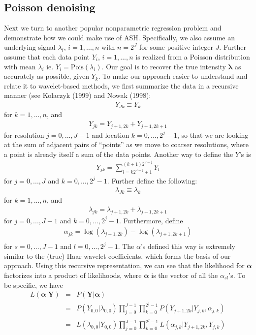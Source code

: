 \documentclass[12pt]{article}
\newcommand{\Ga}{\alpha}
\newcommand{\Gl}{\lambda}    \newcommand{\GL}{\Lambda}
\begin{document}
\subsection{Poisson denoising}
Next we turn to another popular nonparametric regression problem and demonstrate how we could make use of ASH. Specifically, we also assume an underlying signal $\Gl_i$, $i=1,...,n$ with $n=2^J$ for some positive integer $J$. Further assume that each data point $Y_i$, $i=1,...,n$ is realized from a Poisson distribution with mean $\Gl_i$ ie. $Y_i=\textrm{Pois}(\Gl_i)$. Our goal is to recover the true intensity $\bm{\Gl}$ as accurately as possible, given $Y_k$. To make our approach easier to understand and relate it to wavelet-based methods, we first summarize the data in a recursive manner (see Kolaczyk (1999) and Nowak (1998):
\begin{eqnarray}Y_{Jk}\equiv Y_k\end{eqnarray}
for $k=1,...,n$, and
\begin{eqnarray}Y_{jk}=Y_{j+1,2k}+Y_{j+1,2k+1}\end{eqnarray}
for resolution $j=0,...,J-1$ and location $k=0,...,2^j-1$, so that we are looking at the sum of adjacent pairs of ``points'' as we move to coarser resolutions, where a point is already itself a sum of the data points. Another way to define the $Y$'s is
\begin{eqnarray}Y_{jk}=\sum_{l=k2^{J-j}+1}^{(k+1)2^{J-j}}Y_l\end{eqnarray}
for $j=0,...,J$ and $k=0,...,2^j-1$.
Further define the following:
\begin{eqnarray}\Gl_{Jk}\equiv \Gl_k\end{eqnarray}
for $k=1,...,n$, and
\begin{eqnarray}\Gl_{jk}=\Gl_{j+1,2k}+\Gl_{j+1,2k+1}\end{eqnarray}
for $j=0,...,J-1$ and $k=0,...,2^j-1$. Furthermore, define
\begin{eqnarray}\label{eq:poisson wc}\Ga_{jk}=\log(\Gl_{j+1,2k})-\log(\Gl_{j+1,2k+1})\\\end{eqnarray}
for $s=0,...,J-1$ and $l=0,...,2^j-1$. The ${\Ga}$'s defined this way is extremely similar to the (true) Haar wavelet coefficients, which forms the basis of our approach. Using this recursive representation, we can see that the likelihood for $\bm{\Ga}$ factorizes into a product of likelihoods, where $\bm{\Ga}$ is the vector of all the $\Ga_{sl}$'s. To be specific, we have
\begin{eqnarray}
L(\bm{\Ga}|\mathbf{Y})&=&P(\mathbf{Y}|\bm{\Ga})\\
&=&P(Y_{0,0}|\Gl_{0,0})\prod_{j=0}^{J-1}\prod_{k=0}^{2^j-1}P(Y_{j+1,2k}|Y_{j,k},\Ga_{j,k})\\
&=&L(\Gl_{0,0}|Y_{0,0})\prod_{j=0}^{J-1}\prod_{k=0}^{2^j-1}L(\Ga_{j,k}|Y_{j+1,2k},Y_{j,k})
\end{eqnarray}
\end{document}

